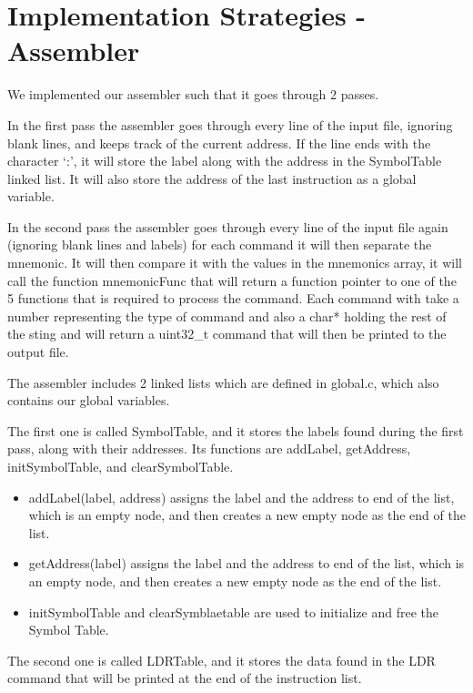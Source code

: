\documentclass[11pt]{article}
\begin{document}
\section{Implementation Strategies - Assembler}
We implemented our assembler such that it goes through 2 passes. \\\par\noindent
In the first pass the assembler goes through every line of the input file, ignoring blank lines, and keeps track of the current address. If the line ends with the character ‘:’, it will store the label along with the address in the SymbolTable linked list.
It will also store the address of the last instruction as a global variable.\\\par\noindent
In the second pass the assembler goes through every line of the input file again (ignoring blank lines and labels) for each command it will then separate the mnemonic. It will then compare it with the values in the mnemonics array, it will call the function mnemonicFunc that will return a function pointer to one of the 5 functions that is required to process the command. Each command with take a number representing the type of command and also a char* holding the rest of the sting and will return a uint32\_t command that will then be printed to the output file.\\ \par \noindent
The assembler includes 2 linked lists which are defined in global.c, which also contains our global variables. \\ \par\noindent
The first one is called SymbolTable, and it stores the labels found during the first pass, along with their addresses. Its functions are addLabel, getAddress, initSymbolTable, and clearSymbolTable.
\begin{itemize}
\item addLabel(label, address) assigns the label and the address to end of the list, which is an empty node, and then creates a new empty node as the end of the list.
\item getAddress(label) assigns the label and the address to end of the list, which is an empty node, and then creates a new empty node as the end of the list.
\item initSymbolTable and clearSymblaetable are used to initialize and free the Symbol Table.
\end{itemize}
The second one is called LDRTable, and it stores the data found in the LDR command that will be printed at the end of the instruction list.
\end{document}
